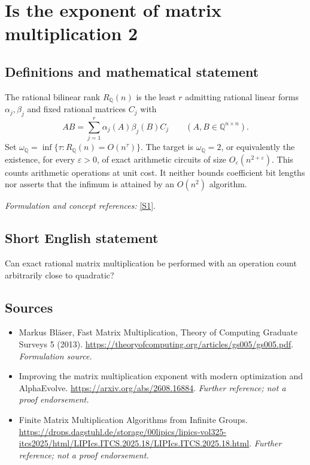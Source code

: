 \documentclass[11pt]{article}
\begin{document}
\section*{\texorpdfstring{Is the exponent of matrix multiplication 2}{Is the exponent of matrix multiplication 2}}\label{3100086}
\subsection{Definitions and mathematical statement}
The rational bilinear rank $R_{{\mathbb{Q}}}(n)$ is the least $r$ admitting rational linear forms $\alpha_j,\beta_j$ and fixed rational matrices $C_j$ with
\[
 AB=\sum_{j=1}^r\alpha_j(A)\beta_j(B)C_j\qquad(A,B\in{\mathbb{Q}}^{n\times n}).
\]
Set $\omega_{{\mathbb{Q}}}=\inf\{\tau:R_{{\mathbb{Q}}}(n)=O(n^\tau)\}$. The target is $\omega_{{\mathbb{Q}}}=2$, or equivalently the existence, for every $\varepsilon>0$, of exact arithmetic circuits of size $O_\varepsilon(n^{2+\varepsilon})$. This counts arithmetic operations at unit cost. It neither bounds coefficient bit lengths nor asserts that the infimum is attained by an $O(n^2)$ algorithm.
\par\smallskip\textit{Formulation and concept references:} \href{https://theoryofcomputing.org/articles/gs005/gs005.pdf}{[S1]}.

\subsection{Short English statement}
Can exact rational matrix multiplication be performed with an operation count arbitrarily close to quadratic?
\subsection{Sources}
\begin{itemize}
\item[S1]Markus Bläser, Fast Matrix Multiplication, Theory of Computing Graduate Surveys 5 (2013).
\url{https://theoryofcomputing.org/articles/gs005/gs005.pdf}.
\textit{Formulation source.}
\item[S2]Improving the matrix multiplication exponent with modern optimization and AlphaEvolve.
\url{https://arxiv.org/abs/2608.16884}.
\textit{Further reference; not a proof endorsement.}
\item[S3]Finite Matrix Multiplication Algorithms from Infinite Groups.
\url{https://drops.dagstuhl.de/storage/00lipics/lipics-vol325-itcs2025/html/LIPIcs.ITCS.2025.18/LIPIcs.ITCS.2025.18.html}.
\textit{Further reference; not a proof endorsement.}
\end{itemize}
\end{document}
